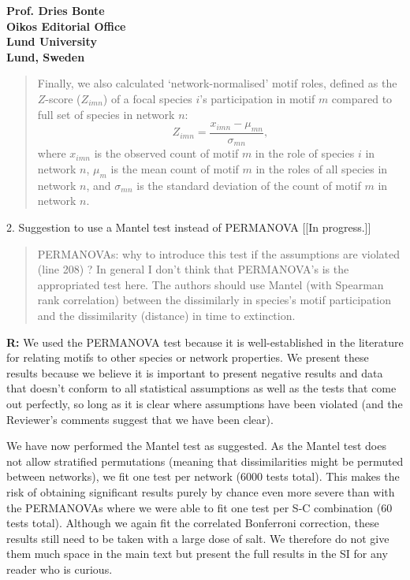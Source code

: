 \documentclass[12pt]{letter}
\begin{document}
\begin{letter}{\bf Prof. Dries Bonte\\
Oikos Editorial Office \\
Lund University \\
Lund, Sweden}
      \begin{quotation}
        Finally, we also calculated `network-normalised' motif roles, defined as the $Z$-score ($Z_{imn}$) of a focal species $i$'s participation in motif $m$ compared to full set of species in network $n$:
        \begin{equation}
                Z_{imn} = \frac{x_{imn}-\mu_{mn}}{\sigma_{mn}} ,
        \end{equation}
        where $x_{imn}$ is the observed count of motif $m$ in the role of species $i$ in network $n$, $\mu_m$ is the mean count of motif $m$ in the roles of all species in network $n$, and $\sigma_{mn}$ is the standard deviation of the count of motif $m$ in network $n$.
      \end{quotation}

    \smallskip

    2. Suggestion to use a Mantel test instead of PERMANOVA [[In progress.]]

      \begin{quotation}
        PERMANOVAs: why to introduce this test if the assumptions are violated (line 208) ? In general I don’t think that PERMANOVA’s is the appropriated test here. The authors should use Mantel (with Spearman rank correlation) between the dissimilarly in species’s motif participation and the dissimilarity (distance) in time to extinction.
      \end{quotation}

      \smallskip

      \textbf{R:} We used the PERMANOVA test because it is well-established in the literature for relating motifs to other species or network properties. We present these results because we believe it is important to present negative results and data that doesn't conform to all statistical assumptions as well as the tests that come out perfectly, so long as it is clear where assumptions have been violated (and the Reviewer's comments suggest that we have been clear). 

      We have now performed the Mantel test as suggested. As the Mantel test does not allow stratified permutations (meaning that dissimilarities might be permuted between networks), we fit one test per network (6000 tests total). This makes the risk of obtaining significant results purely by chance even more severe than with the PERMANOVAs where we were able to fit one test per S-C combination (60 tests total). Although we again fit the correlated Bonferroni correction, these results still need to be taken with a large dose of salt. We therefore do not give them much space in the main text but present the full results in the SI for any reader who is curious.


\end{letter}
\end{document}
